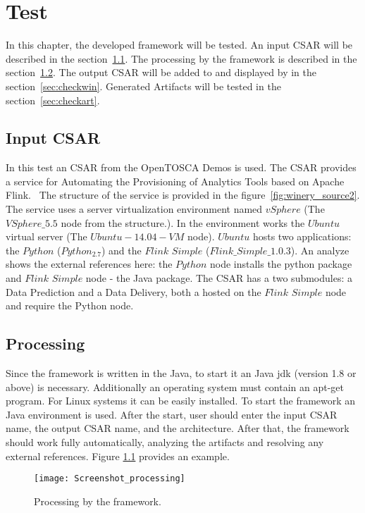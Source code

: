 
\chapter{Test}\label{chap:check}
In this chapter, the developed framework will be tested.
An input CSAR will be described in the section~\ref{sec:inputcsar}.
The processing by the framework is described in the section~\ref{sec:process}.
The output CSAR will be added to and displayed by  in the section~\ref{sec:checkwin}.
Generated Artifacts will be tested in the section~\ref{sec:checkart}.
\section{Input CSAR}\label{sec:inputcsar}
In this test an CSAR from the OpenTOSCA Demos is used. 
The CSAR provides a service for Automating the Provisioning of Analytics Tools based on Apache Flink.~\cite{csar_test}
The structure of the service is provided in the figure~\ref{fig:winery_source2}. 
The service uses a server virtualization environment named $vSphere$ (The $VSphere\_5.5$ node from the structure.). 
In the environment works the $Ubuntu$ virtual server (The $Ubuntu-14.04-VM$ node).
$Ubuntu$ hosts two applications: the $Python$ ($Python_2.7$) and the $Flink$ $Simple$ ($Flink\_Simple\_1.0.3$).
An analyze shows the external references here: the $Python$ node installs the python package and $Flink$ $Simple$ node - the Java package.
The CSAR has a two submodules: a Data Prediction and a Data Delivery, both a hosted on the $Flink$ $Simple$ node and require the Python node. 

\section{Processing}\label{sec:process}
Since the framework is written in the Java, to start it an Java jdk (version 1.8 or above) is necessary.
Additionally an operating system must contain an apt-get program. 
For Linux systems it can be easily installed.
To start the framework an Java environment is used.
After the start, user should enter the input CSAR name, the output CSAR name, and the architecture.
After that, the framework should work fully automatically, analyzing the artifacts and resolving any external references.
Figure \ref{fig:process} provides an example.
\begin{figure}[ht]   
	\centering
	\texttt{[image: Screenshot\_processing]}
	\caption{Processing by the framework.}
	\label{fig:process}
\end{figure}

